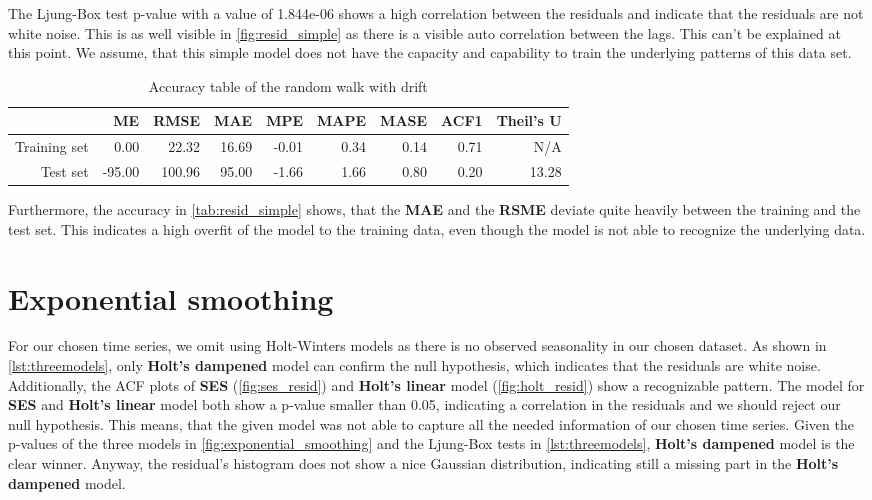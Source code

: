 \documentclass[10pt]{article}
\begin{document}
\noindent The Ljung-Box test p-value with a value of 1.844e-06 shows a high correlation between the residuals and indicate that the residuals are not white noise. This is as well visible in \autoref{fig:resid_simple} as there is a visible auto correlation between the lags. This can't be explained at this point. We assume, that this simple model does not have the capacity and capability to train the underlying patterns of this data set.
\begin{table}[ht]
\centering
\begin{tabular}{rrrrrrrrr}
  \hline
 & ME & \textbf{RMSE} & \textbf{MAE} & MPE & MAPE & MASE & ACF1 & Theil's U \\ 
  \hline
Training set & 0.00 & 22.32 & 16.69 & -0.01 & 0.34 & 0.14 & 0.71 & N/A \\ 
  Test set & -95.00 & 100.96 & 95.00 & -1.66 & 1.66 & 0.80 & 0.20 & 13.28 \\ 
   \hline
\end{tabular}
\caption{Accuracy table of the random walk with drift}
\label{tab:resid_simple}
\end{table}

\noindent Furthermore, the accuracy in \autoref{tab:resid_simple} shows, that the \textbf{MAE} and the \textbf{RSME} deviate quite heavily between the training and the test set. This indicates a high overfit of the model to the training data, even though the model is not able to recognize the underlying data.

\section{Exponential smoothing}
For our chosen time series, we omit using Holt-Winters models as there is no observed seasonality in our chosen dataset. As shown in \autoref{lst:threemodels}, only \textbf{Holt's dampened} model can confirm the null hypothesis, which indicates that the residuals are white noise. Additionally, the ACF plots of \textbf{SES} (\autoref{fig:ses_resid}) and \textbf{Holt's linear} model (\autoref{fig:holt_resid}) show a recognizable pattern. The model for \textbf{SES} and \textbf{Holt's linear} model both show a p-value smaller than 0.05, indicating a correlation in the residuals and we should reject our null hypothesis. This means, that the given model was not able to capture all the needed information of our chosen time series. Given the p-values of the three models in \autoref{fig:exponential_smoothing} and the Ljung-Box tests in \autoref{lst:threemodels}, \textbf{Holt's dampened} model is the clear winner. Anyway, the residual's histogram does not show a nice Gaussian distribution, indicating still a missing part in the \textbf{Holt's dampened} model.
\end{document}
